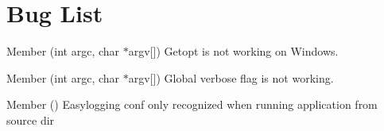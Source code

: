 \chapter{Bug List}
\hypertarget{bug}{}\label{bug}

\begin{DoxyRefList}
\item[Member \doxylink{main_8cpp_a2b2d4ce8b34d14b9e775eaf6214b00e1}{main} (int argc, char \texorpdfstring{$\ast$}{*}argv\mbox{[}\mbox{]})]\label{bug__bug000003}%
%
Getopt is not working on Windows.  
\item[Member \doxylink{classutils_1_1StartupHandler_a9cdd57841cee245c1a1c94b0efe6549c}{utils\+::Startup\+Handler\+::get\+Options} (int argc, char \texorpdfstring{$\ast$}{*}argv\mbox{[}\mbox{]})]\label{bug__bug000002}%
%
 Global verbose flag is not working. 
\item[Member \doxylink{classutils_1_1StartupHandler_ade70b280d4385f270829b177da44b169}{utils\+::Startup\+Handler\+::init\+Easy\+Logging} ()]\label{bug__bug000001}%
%
 Easylogging conf only recognized when running application from source dir 
\end{DoxyRefList}